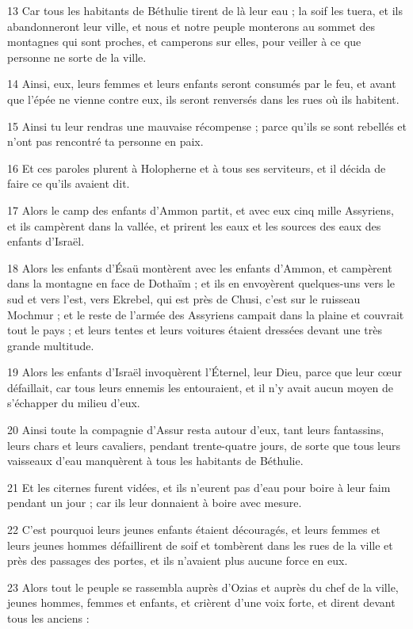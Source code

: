 \par 13 Car tous les habitants de Béthulie tirent de là leur eau ; la soif les tuera, et ils abandonneront leur ville, et nous et notre peuple monterons au sommet des montagnes qui sont proches, et camperons sur elles, pour veiller à ce que personne ne sorte de la ville.
\par 14 Ainsi, eux, leurs femmes et leurs enfants seront consumés par le feu, et avant que l'épée ne vienne contre eux, ils seront renversés dans les rues où ils habitent.
\par 15 Ainsi tu leur rendras une mauvaise récompense ; parce qu'ils se sont rebellés et n'ont pas rencontré ta personne en paix.
\par 16 Et ces paroles plurent à Holopherne et à tous ses serviteurs, et il décida de faire ce qu'ils avaient dit.
\par 17 Alors le camp des enfants d'Ammon partit, et avec eux cinq mille Assyriens, et ils campèrent dans la vallée, et prirent les eaux et les sources des eaux des enfants d'Israël.
\par 18 Alors les enfants d'Ésaü montèrent avec les enfants d'Ammon, et campèrent dans la montagne en face de Dothaïm ; et ils en envoyèrent quelques-uns vers le sud et vers l'est, vers Ekrebel, qui est près de Chusi, c'est sur le ruisseau Mochmur ; et le reste de l'armée des Assyriens campait dans la plaine et couvrait tout le pays ; et leurs tentes et leurs voitures étaient dressées devant une très grande multitude.
\par 19 Alors les enfants d'Israël invoquèrent l'Éternel, leur Dieu, parce que leur cœur défaillait, car tous leurs ennemis les entouraient, et il n'y avait aucun moyen de s'échapper du milieu d'eux.
\par 20 Ainsi toute la compagnie d'Assur resta autour d'eux, tant leurs fantassins, leurs chars et leurs cavaliers, pendant trente-quatre jours, de sorte que tous leurs vaisseaux d'eau manquèrent à tous les habitants de Béthulie.
\par 21 Et les citernes furent vidées, et ils n'eurent pas d'eau pour boire à leur faim pendant un jour ; car ils leur donnaient à boire avec mesure.
\par 22 C'est pourquoi leurs jeunes enfants étaient découragés, et leurs femmes et leurs jeunes hommes défaillirent de soif et tombèrent dans les rues de la ville et près des passages des portes, et ils n'avaient plus aucune force en eux.
\par 23 Alors tout le peuple se rassembla auprès d'Ozias et auprès du chef de la ville, jeunes hommes, femmes et enfants, et crièrent d'une voix forte, et dirent devant tous les anciens :
